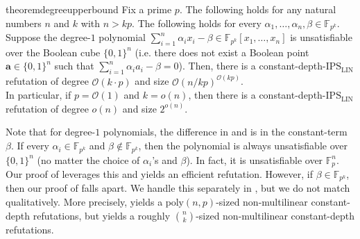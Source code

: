 \documentclass[11pt]{article}
\newtheorem{remark}[theorem]{Remark}
\newcommand{\Boo}{\{0,1 \}}
\newcommand{\bigO}{\mathcal{O}}
\newcommand{\F}{\mathbb{F}}
\newcommand{\comment}[2]{\marginpar{\tiny{\textbf{#1: }\textit{#2}}}}
\newcommand{\vr}[1]{\comment{VR}{#1}}
\newcommand{\IPSLIN}{\mathrm{IPS}_{\mathrm{LIN}}}
\begin{document}
\begin{restatable}{theorem}{degreeupperbound}\label{thm:ub-degree}
Fix a prime $p$. The following holds for any natural numbers $n$ and $k$ with $n > kp$.\newline
The following holds for every $\alpha_{1},\ldots,\alpha_{n},\beta \in \F_{p^{k}}$. Suppose the degree-$1$ polynomial $\sum_{i=1}^{n} \alpha_{i} x_{i} - \beta \in \F_{p^{k}}[x_{1},\ldots,x_{n}]$ is unsatisfiable over the Boolean cube $\Boo^{n}$ (i.e. there does not exist a Boolean point $\mathbf{a} \in \Boo^{n}$ such that $\sum_{i=1}^{n} \alpha_{i} a_{i} - \beta = 0$).\newline
Then, there is a constant-depth-$\IPSLIN$ refutation of degree $\bigO(k \cdot p)$ and size $\bigO(n/kp)^{\bigO(kp)}$.\\

\noindent
In particular, if $p = \bigO(1)$ and $k = o(n)$, then there is a constant-depth-$\IPSLIN$ refutation of degree $o(n)$ and size $2^{o(n)}$.
\end{restatable}

\noindent
Note that for degree-$1$ polynomials, the difference in  and  is in the constant-term $\beta$. If every $\alpha_{i} \in \F_{p^{k}}$ and $\beta \notin \F_{p^{k}}$, then the polynomial is always unsatisfiable over $\Boo^{n}$ (no matter the choice of $\alpha_{i}$'s and $\beta$). In fact, it is unsatisfiable over $\F_{p}^{n}$. Our proof of  leverages this and yields an efficient refutation. However, if $\beta \in \F_{p^{k}}$, then our proof of  falls apart. We handle this separately in , but we do not match  qualitatively. More precisely,  yields a $\mathrm{poly}(n,p)$-sized non-multilinear constant-depth refutations, but  yields a roughly $\binom{n}{k}$-sized non-multilinear constant-depth refutations.

\end{document}
